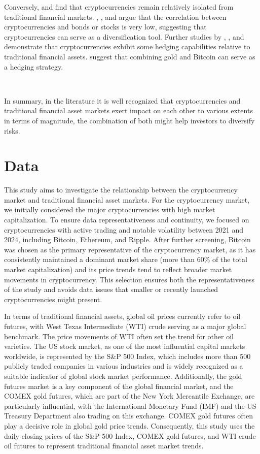 \documentclass{article}
\begin{document}
Conversely, \cite{corbet2019cryptocurrencies} and \cite{baur2018b} find that cryptocurrencies remain relatively isolated from traditional financial markets. \cite{baur2018b}, \cite{briere2015virtual}, and \cite{bouri2018bitcoin} argue that the correlation between cryptocurrencies and bonds or stocks is very low, suggesting that cryptocurrencies can serve as a diversification tool. Further studies by \cite{dyhrberg2016b}, \cite{bouri2018bitcoin}, and \cite{bencheikh2020asymmetric} demonstrate that cryptocurrencies exhibit some hedging capabilities relative to traditional financial assets. \cite{yermack2015} suggest that combining gold and Bitcoin can serve as a hedging strategy.

\


In summary, in the literature it is well recognized that cryptocurrencies and traditional financial asset markets exert impact on each other to various extents in terms of magnitude, the combination of both might help investors to diversify risks. 



\section{Data}


This study aims to investigate the relationship between the cryptocurrency market and traditional financial asset markets. For the cryptocurrency market, we initially considered the major cryptocurrencies with high market capitalization. To ensure data representativeness and continuity, we focused on cryptocurrencies with active trading and notable volatility between 2021 and 2024, including Bitcoin, Ethereum, and Ripple. After further screening, Bitcoin was chosen as the primary representative of the cryptocurrency market, as it has consistently maintained a dominant market share (more than 60\% of the total market capitalization) and its price trends tend to reflect broader market movements in cryptocurrency. This selection ensures both the representativeness of the study and avoids data issues that smaller or recently launched cryptocurrencies might present.

In terms of traditional financial assets, global oil prices currently refer to oil futures, with West Texas Intermediate (WTI) crude serving as a major global benchmark. The price movements of WTI often set the trend for other oil varieties. The US stock market, as one of the most influential capital markets worldwide, is represented by the S\&P 500 Index, which includes more than 500 publicly traded companies in various industries and is widely recognized as a suitable indicator of global stock market performance. Additionally, the gold futures market is a key component of the global financial market, and the COMEX gold futures, which are part of the New York Mercantile Exchange, are particularly influential, with the International Monetary Fund (IMF) and the US Treasury Department also trading on this exchange. COMEX gold futures often play a decisive role in global gold price trends. Consequently, this study uses the daily closing prices of the S\&P 500 Index, COMEX gold futures, and WTI crude oil futures to represent traditional financial asset market trends.
 
\end{document}
